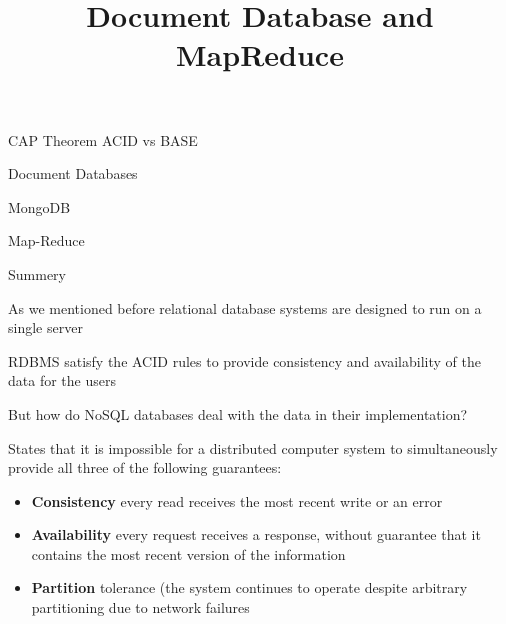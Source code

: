 \documentclass{beamer}
\title{Document Database and MapReduce}
\author{ }
\institute{Hogeschool Rotterdam \\ 
Rotterdam, Netherlands}
\date{}
\begin{document}
\maketitle

\begin{slide}{
\item CAP Theorem ACID vs BASE
\item Document Databases 
\item MongoDB
\item Map-Reduce 
\item Summery
}\end{slide}

\begin{slide}{
\item As we mentioned before relational database systems are designed to run on a single server
\item RDBMS satisfy the ACID rules to provide consistency and availability of the data for the users  
\item But how do NoSQL databases deal with the data in their implementation?
}\end{slide}

\begin{slide}{
\item States that it is impossible for a distributed computer system to simultaneously provide all three of the following guarantees:
\begin{itemize}
	\item \textbf{Consistency} every read receives the most recent write or an error
	\item \textbf{Availability} every request receives a response, without guarantee that it contains the most recent version of the information
	\item \textbf{Partition} tolerance (the system continues to operate despite arbitrary partitioning due to network failures
\end{itemize}
}\end{slide}
\end{document}
